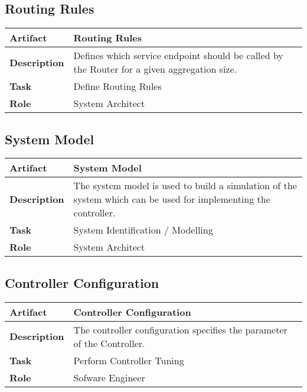 \subsection{Routing Rules}

\begin{tabularx}{\textwidth}{@{} l X @{}}
	\caption{Routing Rules} \label{table:ch6_Artifact_Routing_Rules}\\
	\toprule 
	\bfseries Artifact & Routing Rules\\
	\midrule 
	\bfseries Description & Defines which service endpoint should be called by the Router for a given aggregation size.\\
	\midrule 
	\bfseries Task & Define Routing Rules
		\\
	\midrule 
	\bfseries Role & System Architect\\
	\bottomrule 
\end{tabularx}


\subsection{System Model}

\begin{tabularx}{\textwidth}{@{} l X @{}}
	\caption{System Model} \label{table:ch6_Artifact_System_Model}\\
	\toprule 
	\bfseries Artifact & System Model\\
	\midrule 
	\bfseries Description & The system model is used to build a simulation of the system which can be used for implementing the controller.\\
	\midrule 
	\bfseries Task & System Identification / Modelling
	\\
	\midrule 
	\bfseries Role & System Architect\\
	\bottomrule 
\end{tabularx}


\subsection{Controller Configuration}

\begin{tabularx}{\textwidth}{@{} l X @{}}
	\caption{Controller Configuration} \label{table:ch6_Artifact_Controller_Configuration}\\
	\toprule \bfseries Artifact & Controller Configuration\\
	\midrule 
	\bfseries Description & The controller configuration specifies the parameter of the Controller.\\
	\midrule 
	\bfseries Task & Perform Controller Tuning
		\\
	\midrule 
	\bfseries Role & Sofware Engineer\\
	\bottomrule 
\end{tabularx}



